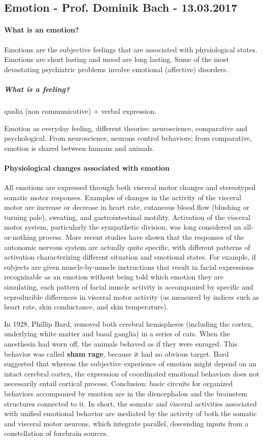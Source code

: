 \documentclass[12pt,article,oneside,a4paper]{memoir}
\begin{document}
\newpage
\subsection{Emotion - Prof. Dominik Bach - 13.03.2017}

\paragraph{What is an emotion?}
Emotions are the subjective feelings that are associated with physiological
states. Emotions are short lasting and mood are long lasting. Some of the most
devastating psychiatric problems involve emotional (affective) disorders.

\subparagraph{What is a feeling?}
qualia (non communicative) + verbal expression.

Emotion as everyday feeling, different theories: neuroscience, comparative and
psychological. From neuroscience, neurons control behaviors; from comparative, 
emotion is shared between humans and animals.

\paragraph{Physiological changes associated with emotion}
All emotions are expressed through both visceral motor changes and stereotyped
somatic motor responses. Examples of changes in the activity of the visceral
motor are increase or decrease in heart rate, cutaneous blood flow (blushing or
turning pale), sweating, and gastrointestinal motility.
Activation of the visceral motor system, particularly the sympathetic division,
was long considered an all-or-nothing process. More recent studies have shown
that the responses of the autonomic nervous system are actually quite specific,
with different patterns of activation characterizing different situation and
emotional states. For example, if subjects are given muscle-by-muscle
instructions that result in facial expressions recognizable as an emotion
without being told which emotion they are simulating, each pattern of facial
muscle activity is accompanied by specific and reproducible differences in
visceral motor activity (as measured by indices such as heart rate, skin
conductance, and skin temperature). 

In 1928, Phillip Bard, removed both cerebral hemispheres (including the cortex,
underlying white matter and basal ganglia) in a series of cats.
When the anesthesia had worn off, the animals behaved as if they were enraged.
This behavior was called \textbf{sham rage}, because it had no obvious target.
Bard suggested that whereas the subjective experience of emotion might depend
on an intact cerebral cortex, the expression of coordinated emotional behaviors
does not necessarily entail cortical process. Conclusion: basic circuits for
organized behaviors accompanied by emotion are in the diencephalon and the
brainstem structures connected to it.
In short, the somatic and visceral activities associated with unified emotional
behavior are mediated by the activity of both the somatic and visceral motor
neurons, which integrate parallel, descending inputs from a constellation of 
forebrain sources. 
\end{document}
